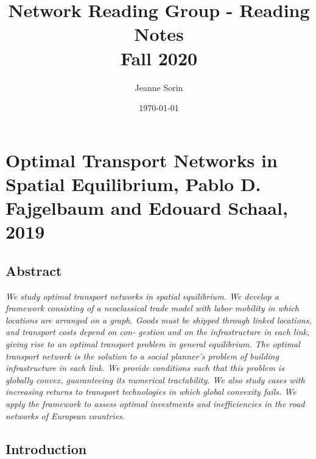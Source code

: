 \documentclass[10pt, final]{article}
\title{Network Reading Group - Reading Notes \\ Fall 2020}
\author{Jeanne Sorin}
\date{\today}
\begin{document}
\newcommand{\hatxi}{\hat{\mathbf{x}}^i}
\newcommand{\tildexi}{\tilde{\mathbf{x}}^i}

\maketitle

\section{Optimal Transport Networks in Spatial Equilibrium,
Pablo D. Fajgelbaum and Edouard Schaal, 2019} 

\subsection*{Abstract} %
\label{sub:abstract}

\textit{We study optimal transport networks in spatial equilibrium. We develop a framework consisting of a neoclassical trade model with labor mobility in which locations are arranged on a graph. Goods must be shipped through linked locations, and transport costs depend on con- gestion and on the infrastructure in each link, giving rise to an optimal transport problem in general equilibrium. The optimal transport network is the solution to a social planner’s problem of building infrastructure in each link. We provide conditions such that this problem is globally convex, guaranteeing its numerical tractability. We also study cases with increasing returns to transport technologies in which global convexity fails. We apply the framework to assess optimal investments and inefficiencies in the road networks of European countries.}

\subsection*{Introduction} %
\label{sub:introduction}
\end{document}
